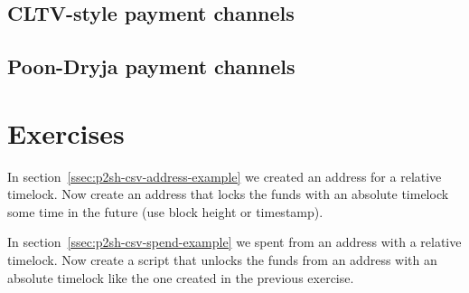 \subsection*{CLTV-style payment channels}


\subsection*{Poon-Dryja payment channels}




\section{Exercises}

\begin{exercise}
In section~\ref{ssec:p2sh-csv-address-example} we created an address for a relative timelock. Now create an address that locks the funds with an absolute timelock some time in the future (use block height or timestamp).
\end{exercise}

\begin{exercise}
In section~\ref{ssec:p2sh-csv-spend-example} we spent from an address with a relative timelock. Now create a script that unlocks the funds from an address with an absolute timelock like the one created in the previous exercise.
\end{exercise}





